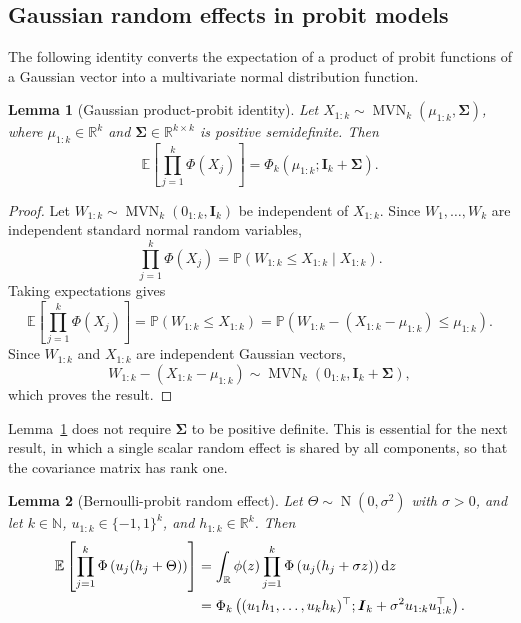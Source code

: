 \documentclass[11pt,authoryear]{elsarticle}
\def\Real{\mathbb{R}}
\def\P#1{{\mathbb{P}}\left(#1\right)}
\def\E#1{{\mathbb E}\left[#1\right]}
\newtheorem{lemma}{Lemma}
\numberwithin{equation}{section}
\begin{document}
\subsection{Gaussian random effects in probit models}

The following identity converts the expectation of a product of probit
functions of a Gaussian vector into a multivariate normal distribution
function.

\begin{lemma}[Gaussian product-probit identity]
\label{lem.probit}
Let \(X_{1:k}\sim\operatorname{MVN}_k(\mu_{1:k},\boldsymbol\Sigma)\),
where \(\mu_{1:k}\in\Real^k\) and \(\boldsymbol\Sigma\in\Real^{k\times k}\)
is positive semidefinite. Then
\[
\E{\prod_{j=1}^k\Phi(X_j)}
=
\Phi_k\left(\mu_{1:k};\boldsymbol I_k+\boldsymbol\Sigma\right).
\]
\end{lemma}

\begin{proof}
Let \(W_{1:k}\sim\operatorname{MVN}_k(0_{1:k},\boldsymbol I_k)\) be
independent of \(X_{1:k}\). Since \(W_1,\ldots,W_k\) are independent
standard normal random variables,
\[
\prod_{j=1}^k\Phi(X_j)
=
\P{W_{1:k}\le X_{1:k}\mid X_{1:k}}.
\]
Taking expectations gives
\[
\E{\prod_{j=1}^k\Phi(X_j)}
=
\P{W_{1:k}\le X_{1:k}}
=
\P{W_{1:k}-\left(X_{1:k}-\mu_{1:k}\right)\le\mu_{1:k}}.
\]
Since \(W_{1:k}\) and \(X_{1:k}\) are independent Gaussian vectors,
\[
W_{1:k}-\left(X_{1:k}-\mu_{1:k}\right)
\sim
\operatorname{MVN}_k\left(0_{1:k},\boldsymbol I_k+\boldsymbol\Sigma\right),
\]
which proves the result.
\end{proof}

Lemma~\ref{lem.probit} does not require \(\boldsymbol\Sigma\) to be
positive definite. This is essential for the next result, in which a
single scalar random effect is shared by all components, so that the
covariance matrix has rank one.

\begin{lemma}[Bernoulli-probit random effect]
\label{lem.bp}
Let \(\Theta\sim\operatorname{N}(0,\sigma^2)\) with \(\sigma>0\), and let
\(k\in\mathbb N\), \(u_{1:k}\in\{-1,1\}^k\), and \(h_{1:k}\in\Real^k\).
Then
\[
\begin{aligned}
\E{\prod_{j=1}^k\Phi\left(u_j(h_j+\Theta)\right)}
&=
\int_{\Real}\phi(z)\prod_{j=1}^k\Phi\left(u_j(h_j+\sigma z)\right)
{\rm d}z\\
&=
\Phi_k\left(
(u_1h_1,\ldots,u_kh_k)^\top;
\boldsymbol I_k+\sigma^2u_{1:k}u_{1:k}^\top
\right).
\end{aligned}
\]
\end{lemma}
\end{document}
